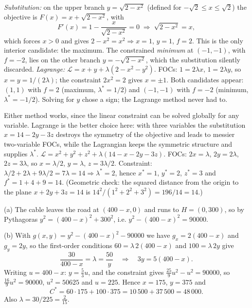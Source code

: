\begin{solutions}
  \item \emph{Substitution:} on the upper branch $y = \sqrt{2 - x^2}$ (defined for $-\sqrt{2} \leq x \leq \sqrt{2}$) the objective is $F(x) = x + \sqrt{2 - x^2}$, with
  \[
  F'(x) = 1 - \frac{x}{\sqrt{2 - x^2}} = 0 \;\Rightarrow\; \sqrt{2 - x^2} = x,
  \]
  which forces $x > 0$ and gives $2 - x^2 = x^2 \Rightarrow x = 1$, $y = 1$, $f = 2$. This is the only interior candidate: the maximum. The constrained \emph{minimum} at $(-1, -1)$, with $f = -2$, lies on the other branch $y = -\sqrt{2 - x^2}$, which the substitution silently discarded.
  \emph{Lagrange:} $\mathcal{L} = x + y + \lambda(2 - x^2 - y^2)$. FOCs: $1 = 2 \lambda x$, $1 = 2 \lambda y$, so $x = y = 1/(2 \lambda)$; the constraint $2 x^2 = 2$ gives $x = \pm 1$. Both candidates appear: $(1, 1)$ with $f = 2$ (maximum, $\lambda^* = 1/2$) and $(-1, -1)$ with $f = -2$ (minimum, $\lambda^* = -1/2$). Solving for $y$ chose a sign; the Lagrange method never had to.
  \item Either method works, since the linear constraint can be solved globally for any variable. Lagrange is the better choice here: with three variables the substitution $x = 14 - 2 y - 3 z$ destroys the symmetry of the objective and leads to messier two-variable FOCs, while the Lagrangian keeps the symmetric structure and supplies $\lambda^*$.
  $\mathcal{L} = x^2 + y^2 + z^2 + \lambda(14 - x - 2 y - 3 z)$. FOCs: $2 x = \lambda$, $2 y = 2 \lambda$, $2 z = 3 \lambda$, so $x = \lambda/2$, $y = \lambda$, $z = 3 \lambda/2$. Constraint: $\lambda/2 + 2 \lambda + 9 \lambda/2 = 7 \lambda = 14 \Rightarrow \lambda^* = 2$, hence $x^* = 1$, $y^* = 2$, $z^* = 3$ and $f^* = 1 + 4 + 9 = 14$. (Geometric check: the squared distance from the origin to the plane $x + 2 y + 3 z = 14$ is $14^2/(1^2 + 2^2 + 3^2) = 196/14 = 14$.) \checkmark

  \item (a) The cable leaves the road at $(400-x,0)$ and runs to
        $H=(0,300)$, so by Pythagoras
        $y^{2}=(400-x)^{2}+300^{2}$, i.e. $y^{2}-(400-x)^{2}=90000$.

        (b) With $g(x,y)=y^{2}-(400-x)^{2}-90000$ we have
        $g_{x}=2(400-x)$ and $g_{y}=2y$, so the first-order conditions
        $60=\lambda\,2(400-x)$ and $100=\lambda\,2y$ give
        \[
          \frac{30}{400-x}=\lambda=\frac{50}{y}
          \quad\Longrightarrow\quad 3y=5(400-x).
        \]
        Writing $u=400-x$: $y=\tfrac53u$, and the constraint gives
        $\tfrac{25}{9}u^{2}-u^{2}=90000$, so $\tfrac{16}{9}u^{2}=90000$,
        $u^{2}=50625$ and $u=225$. Hence $x=175$, $y=375$ and
        \[
          C^{*}=60\cdot175+100\cdot375=10\,500+37\,500=48\,000 .
        \]
        Also $\lambda=30/225=\tfrac{2}{15}$.


\end{solutions}
